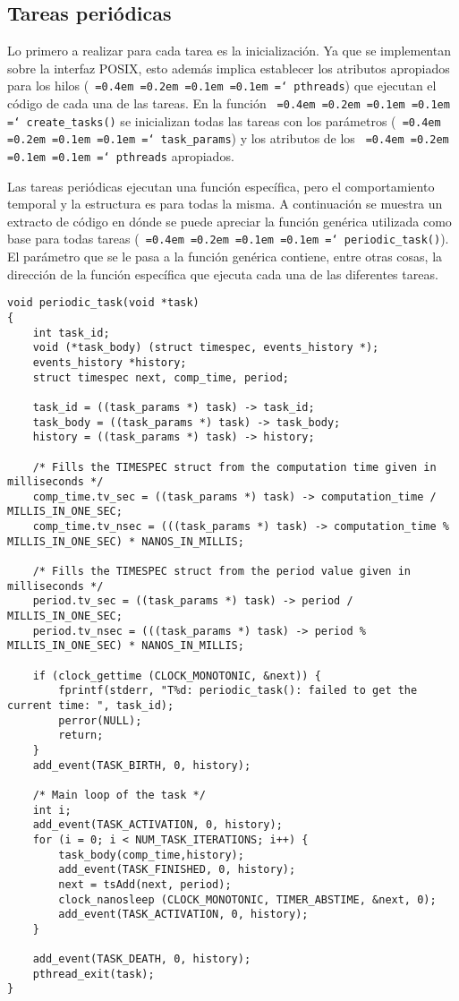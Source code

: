 \documentclass[11pt,spanish]{article}
\newcommand*\justify{%
  \fontdimen2\font=0.4em%
  \fontdimen3\font=0.2em%
  \fontdimen4\font=0.1em%
  \fontdimen7\font=0.1em%
  \hyphenchar\font=`\-%
}
\newcommand{\code}[1]{\texttt{\justify #1}}
\begin{document}
\subsection{Tareas periódicas}
Lo primero a realizar para cada tarea es la inicialización. Ya que se implementan
sobre la interfaz POSIX, esto además implica establecer los atributos apropiados para los
hilos (\code{pthreads}) que ejecutan el código de cada una de las tareas. En la función
\code{create\_tasks()} se inicializan todas las tareas con los parámetros (\code{task\_params})
y los atributos de los \code{pthreads} apropiados.

Las tareas periódicas ejecutan una función específica, pero el comportamiento temporal 
y la estructura es para todas la misma. A continuación se muestra un extracto de código 
en dónde se puede apreciar la función genérica utilizada como base para todas tareas 
(\code{periodic\_task()}). El parámetro que se le pasa a la función genérica contiene, 
entre otras cosas, la dirección de la función específica que ejecuta cada una de las 
diferentes tareas. 

\begin{lstlisting}[style=c]
void periodic_task(void *task)
{
    int task_id;
    void (*task_body) (struct timespec, events_history *);
    events_history *history;
    struct timespec next, comp_time, period;
    
    task_id = ((task_params *) task) -> task_id;
    task_body = ((task_params *) task) -> task_body;
    history = ((task_params *) task) -> history;

    /* Fills the TIMESPEC struct from the computation time given in milliseconds */ 
    comp_time.tv_sec = ((task_params *) task) -> computation_time / MILLIS_IN_ONE_SEC;
    comp_time.tv_nsec = (((task_params *) task) -> computation_time % MILLIS_IN_ONE_SEC) * NANOS_IN_MILLIS;

    /* Fills the TIMESPEC struct from the period value given in milliseconds */ 
    period.tv_sec = ((task_params *) task) -> period / MILLIS_IN_ONE_SEC;
    period.tv_nsec = (((task_params *) task) -> period % MILLIS_IN_ONE_SEC) * NANOS_IN_MILLIS;

    if (clock_gettime (CLOCK_MONOTONIC, &next)) {
        fprintf(stderr, "T%d: periodic_task(): failed to get the current time: ", task_id);
        perror(NULL);
        return;
    }
    add_event(TASK_BIRTH, 0, history);

    /* Main loop of the task */
    int i;
    add_event(TASK_ACTIVATION, 0, history);
    for (i = 0; i < NUM_TASK_ITERATIONS; i++) {
        task_body(comp_time,history);
        add_event(TASK_FINISHED, 0, history);
        next = tsAdd(next, period);
        clock_nanosleep (CLOCK_MONOTONIC, TIMER_ABSTIME, &next, 0);
        add_event(TASK_ACTIVATION, 0, history);
    }

    add_event(TASK_DEATH, 0, history);
    pthread_exit(task);
}
\end{lstlisting}
\end{document}
